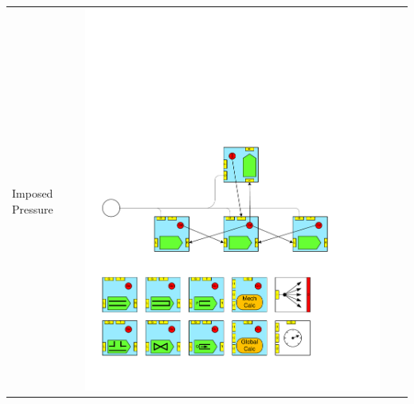 \begin{table}
\begin{center}
\begin{tabular}{|p{2cm}|c|p{2cm}|c|}
Imposed Pressure 			&\includegraphics[page=13, scale=0.25]{./figs/1dcfd/ElementalProcessors.pdf} &

\end{tabular}
\end{center}
\end{table}
